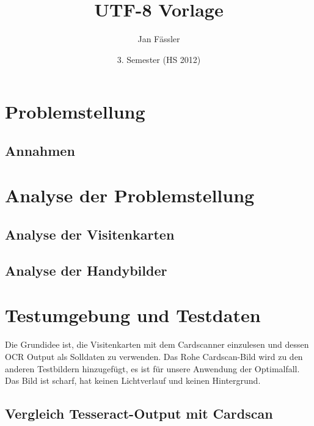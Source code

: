 \documentclass[10pt]{article}
\title{
	\vspace{5cm}
	UTF-8 Vorlage
}
\author{Jan Fässler}
\date{3. Semester (HS 2012)}
\begin{document}
\maketitle
\thispagestyle{fancy}

\newpage

\tableofcontents	  	


\newpage
\setcounter{page}{1}


\section{Problemstellung}


\subsection{Annahmen}


\section{Analyse der Problemstellung}

\subsection{Analyse der Visitenkarten}

\subsection{Analyse der Handybilder}



\section{Testumgebung und Testdaten}

Die Grundidee ist, die Visitenkarten mit dem Cardscanner einzulesen und dessen OCR Output als Solldaten zu verwenden. 
Das Rohe Cardscan-Bild wird zu den anderen Testbildern hinzugefügt, es ist für unsere Anwendung der Optimalfall. Das Bild ist scharf, hat keinen Lichtverlauf und keinen Hintergrund.
\subsection{Vergleich Tesseract-Output mit Cardscan}
\end{document}
